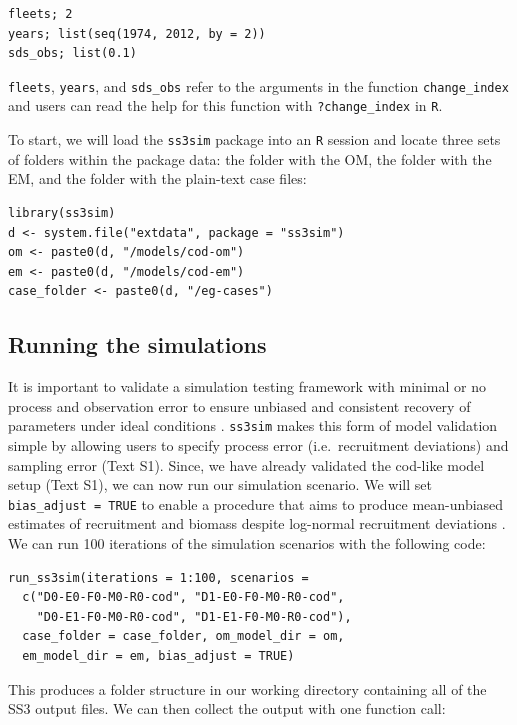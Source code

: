 \documentclass[11pt]{article}
\begin{document}
\begin{verbatim}
fleets; 2
years; list(seq(1974, 2012, by = 2))
sds_obs; list(0.1)
\end{verbatim}

\noindent
\texttt{fleets}, \texttt{years}, and \texttt{sds\_obs} refer to the arguments in the function \texttt{change\_index} and users can read the help for this function with \texttt{?change\_index} in \texttt{R}.

To start, we will load the \texttt{ss3sim} package into an \texttt{R} session and locate three sets of folders within the package data: the folder with the OM, the folder with the EM, and the folder with the plain-text case files:

\begin{verbatim}
library(ss3sim)
d <- system.file("extdata", package = "ss3sim")
om <- paste0(d, "/models/cod-om")
em <- paste0(d, "/models/cod-em")
case_folder <- paste0(d, "/eg-cases")
\end{verbatim}

\subsection*{Running the simulations}

It is important to validate a simulation testing framework with minimal or no process and observation error to ensure unbiased and consistent recovery of parameters under ideal conditions \cite{hilborn1992, rykiel1996}. \texttt{ss3sim} makes this form of model validation simple by allowing users to specify process error (i.e.~recruitment deviations) and sampling error (Text S1). Since, we have already validated the cod-like model setup (Text S1), we can now run our simulation scenario. We will set \texttt{bias\_adjust = TRUE} to enable a procedure that aims to produce mean-unbiased estimates of recruitment and biomass despite log-normal recruitment deviations \cite{methot2011}. We can run 100 iterations of the simulation scenarios with the following code:

\begin{verbatim}
run_ss3sim(iterations = 1:100, scenarios =
  c("D0-E0-F0-M0-R0-cod", "D1-E0-F0-M0-R0-cod",
    "D0-E1-F0-M0-R0-cod", "D1-E1-F0-M0-R0-cod"),
  case_folder = case_folder, om_model_dir = om,
  em_model_dir = em, bias_adjust = TRUE)
\end{verbatim}

This produces a folder structure in our working directory containing all of the SS3 output files. We can then collect the output with one function call:
\end{document}
